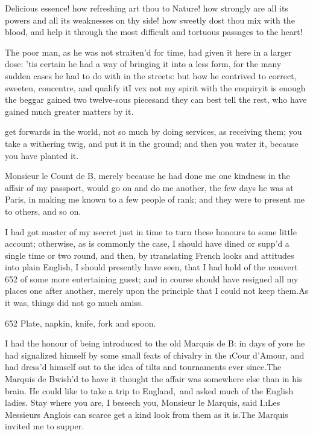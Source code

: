 \documentclass[twoside]{article}
\begin{document}
Delicious essence! how refreshing art thou
to Nature! how strongly are all its powers
and all its weaknesses on thy side! how
sweetly dost thou mix with the blood, and
help it through the most difficult and
tortuous passages to the heart!

The poor man, as he was not straiten’d for
time, had given it here in a larger dose:
’tis certain he had a way of bringing it
into a less form, for the many sudden
cases he had to do with in the streets:
but how he contrived to correct, sweeten,
concentre, and qualify it\tskk I vex not
my spirit with the enquiry\tskk it is
enough the beggar gained two twelve-sous
pieces\tskk and they can best tell the
rest, who have gained much greater matters
by it.





\vskip 6pt


 get forwards in the world,
not so much by doing services, as
receiving them; you take a withering twig,
and put it in the ground; and then you
water it, because you have planted it.

Monsieur le Count de B\anon, merely
because he had done me one kindness in the
affair of my passport, would go on and do
me another, the few days he was at Paris,
in making me known to a few people of
rank; and they were to present me to
others, and so on.

I had got master of my \i{secret} just in
time to turn these honours to some little
account; otherwise, as is commonly the
case, I should have dined or supp’d a
single time or two round, and then, by
\i{translating} French looks and attitudes
into plain English, I should presently
have seen, that I had hold of the
\i{couvert} {652} of some more
entertaining guest; and in course should
have resigned all my places one after
another, merely upon the principle that I
could not keep them.\tskk As it was,
things did not go much amiss.

{652}  Plate, napkin, knife, fork and
spoon.

I had the honour of being introduced to
the old Marquis de B\tskk : in days of
yore he had signalized himself by some
small feats of chivalry in the \i{Cour
d’Amour}, and had dress’d himself out to
the idea of tilts and tournaments ever
since.\tskk The Marquis de B\tskk  wish’d
to have it thought the affair was
somewhere else than in his brain.  \lqq He
could like to take a trip to England,\rqq\ and
asked much of the English ladies.\tskk
Stay where you are, I beseech you,
Monsieur le Marquis, said I.\tskk \i{Les
Messieurs Anglois} can scarce get a kind
look from them as it is.\tskk The Marquis
invited me to supper.
\end{document}
